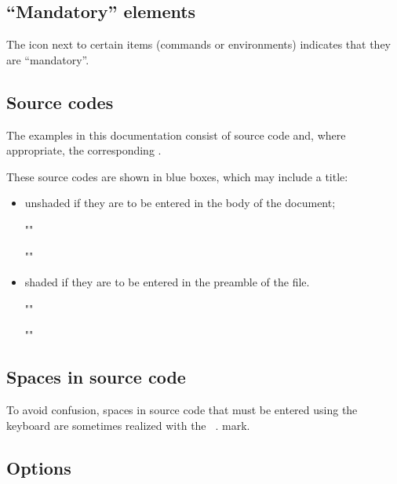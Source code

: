 \documentclass[english,nolocaltoc]{nwejmart}
\newtheorem[style=definition]{fact}
\newtheorem[title=experience]{experience}
\newtheorem[title-plural=rings]{ring}
\newtheorem[title=ideal,title-plural=ideals]{ideal}
\begin{document}
\subsection{\enquote{Mandatory} elements}
\label{sec-comm-oblig}

The \mandatory{} icon next to certain items (commands or
environments) indicates that they are \enquote{mandatory}.

\subsection{Source codes}
\label{sec-codes-sources}

The examples in this documentation consist of source code and, where
appropriate, the corresponding .

These source codes are shown in blue boxes, which may include a title:
\begin{itemize}
\item unshaded if they are to be entered in the body of the document;
\begin{bodycode}
""
\end{bodycode}
\begin{bodycode}[title=\meta{title}]
""
\end{bodycode}
\item shaded if they are to be entered in the preamble of the file.
\begin{preamblecode}
""
\end{preamblecode}
\begin{preamblecode}[title=\meta{title}]
""
\end{preamblecode}
\end{itemize}

\subsection{Spaces in source code}
\label{sec-espaces-dans-les}

To avoid confusion, spaces in source code that must be entered using
the keyboard are sometimes realized with the \lstinline[showspaces]+ +. mark.

\subsection{Options}
\label{sec-options}
\end{document}
